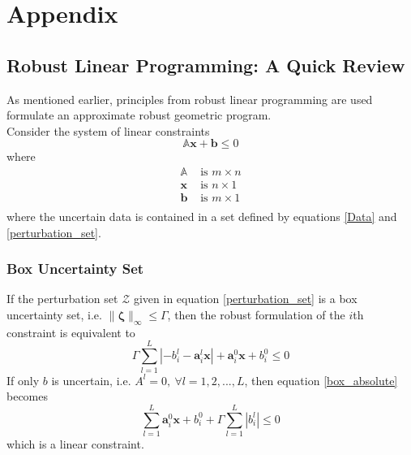 \section*{Appendix}

\subsection{Robust Linear Programming: A Quick Review} \label{LP_to_GP}

As mentioned earlier, principles from robust linear programming are used
formulate an approximate robust geometric program.\\[12pt]
Consider the system of linear constraints
\begin{equation*}
    \mathbb{A}\mathbf{x} + \mathbf{b} \leq 0
\end{equation*}
where
\begin{equation}
    \begin{split}
        \mathbb{A} &\text{ is $m \times n$}\\
        \mathbf{x} &\text{ is $n \times 1$}\\
        \mathbf{b} &\text{ is $m \times 1$}\\
    \end{split}
\end{equation}
where the uncertain data is contained in a set defined by equations \eqref{Data} and \eqref{perturbation_set}.

\subsubsection{Box Uncertainty Set}
If the perturbation set $\mathcal{Z}$ given in equation \eqref{perturbation_set} is a box
uncertainty set, i.e. $\|\mathbf{\zeta}\|_{\infty} \leq \Gamma$, then the robust formulation of the $i$th constraint is equivalent to
\begin{equation}
    \Gamma \textstyle{\sum}_{l=1}^L |- {b}^l_{i} - \mathbf{a}^l_i\mathbf{x}| + \mathbf{a}^0_i\mathbf{x} + b^0_i \leq 0
    \label{box_absolute}
\end{equation}
If only $b$ is uncertain, i.e. $A^l = 0,~\forall l = 1,2,...,L$, then equation \eqref{box_absolute} becomes
\begin{equation}
    \textstyle{\sum}_{l=1}^L \mathbf{a}^0_{i}\mathbf{x} + b^0_{i} + \Gamma \textstyle{\sum}_{l=1}^L |b^l_{i}| \leq 0
    \label{box_coeff}
\end{equation}
which is a linear constraint.

